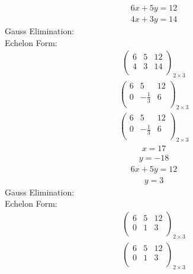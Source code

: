 \documentclass{article}
\begin{document}
\begin{align*}
6x + 5y=12\end{align*}
\begin{align*}
4x + 3y=14\end{align*}
Gauss Elimination:\\
Echelon Form:\\
\begin{align*}
\left(
\begin{array}{cc|c}
6 & 5 & 12\\
4 & 3 & 14\\
\end{array}
\right)_{2\times 3}
\end{align*}
\begin{align*}
\left(
\begin{array}{cc|c}
6 & 5 & 12\\
0 & -\frac{1}{3} & 6\\
\end{array}
\right)_{2\times 3}
\end{align*}
\begin{align*}
\left(
\begin{array}{cc|c}
6 & 5 & 12\\
0 & -\frac{1}{3} & 6\\
\end{array}
\right)_{2\times 3}
\end{align*}
\begin{align*}
x=17\end{align*}
\begin{align*}
y=-18\end{align*}
\begin{align*}
6x + 5y=12\end{align*}
\begin{align*}
y=3\end{align*}
Gauss Elimination:\\
Echelon Form:\\
\begin{align*}
\left(
\begin{array}{cc|c}
6 & 5 & 12\\
0 & 1 & 3\\
\end{array}
\right)_{2\times 3}
\end{align*}
\begin{align*}
\left(
\begin{array}{cc|c}
6 & 5 & 12\\
0 & 1 & 3\\
\end{array}
\right)_{2\times 3}
\end{align*}
\end{document}
